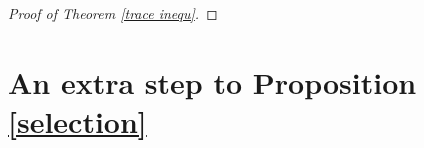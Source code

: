 \documentclass[reqno,11pt]{amsart}
\def\diam{{\mathop\mathrm{\,diam\,}}}
\numberwithin{equation}{section}
\theoremstyle{remark}
\begin{document}
\begin{proof}[Proof of Theorem \ref{trace inequ}]



\end{proof}

\section{An extra step to Proposition \ref{selection}}
\end{document}
